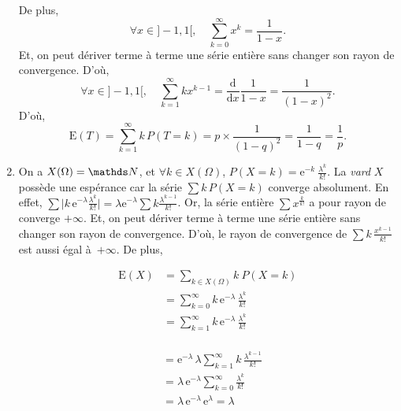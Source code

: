 \begin{exo}
\begin{enumerate}
      De plus, \[
        \forall x \in {]-1,1[},\quad \sum_{k=0}^\infty x^k = \frac{1}{1-x}
      .\] Et, on peut dériver terme à terme une série entière sans changer son rayon de convergence. D'où, \[
        \forall x \in {]-1,1[},\quad
        \sum_{k=1}^\infty k x^{k-1} = \frac{\mathrm{d}}{\mathrm{d}x} \frac{1}{1-x} = \frac{1}{(1-x)^2}
      .\]
      D'où, \[
        \mathrm{E}(T) = \sum_{k=1}^\infty k\,P(T = k) = p \times \frac{1}{(1-q)^2} = \frac{1}{1-q} = \frac{1}{p}
      .\]
    \item On a $X(\Omega) = \N$, et $\forall k \in X(\Omega)$, $P(X = k) = \mathrm{e}^{-k} \: \frac{\lambda^k}{k!}$.
      La \textit{vard} $X$\/ possède une espérance car la série $\sum k\, P(X=k)$\/ converge absolument. En effet, $\sum \big|k\,\mathrm{e}^{-\lambda} \frac{\lambda^k}{k!}\big| = \lambda \mathrm{e}^{-\lambda} \sum k \frac{\lambda^{k-1}}{k!}$.
      Or, la série entière $\sum x^\frac{k}{k!}$\/ a pour rayon de converge $+\infty$\/. Et, on peut dériver terme à terme une série entière sans changer son rayon de convergence. D'où, le rayon de convergence de $\sum k\,\frac{x^{k-1}}{k!}$\/ est aussi égal à~$+\infty$\/.
      De plus,
      \begin{multicols}{2}
        \begin{align*}
          \mathrm{E}(X) &= \sum_{k \in X(\Omega)} k\: P(X = k)\\
          &= \sum_{k=0}^\infty k\, \mathrm{e}^{-\lambda}\, \frac{\lambda^k}{k!} \\
          &= \sum_{k=1}^\infty k\, \mathrm{e}^{-\lambda}\, \frac{\lambda^k}{k!} \\
        \end{align*}

        \begin{align*}
          &= \mathrm{e}^{-\lambda}\, \lambda \sum_{k=1}^\infty k\, \frac{\lambda^{k-1}}{k!} \\
          &= \lambda\,\mathrm{e}^{-\lambda} \sum_{k=0}^\infty \frac{\lambda^k}{k!} \\
          &= \lambda\, \mathrm{e}^{-\lambda}\, \mathrm{e}^{\lambda} = \lambda \\
        \end{align*}
      \end{multicols}
  \end{enumerate}
\end{exo}

